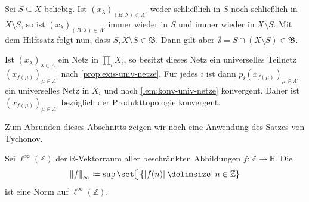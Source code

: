 \begin{beweis}
	Sei $S \subseteq X$ beliebig. 
	Ist $(x_\lambda )_{(B,\lambda)  \in \Lambda'}$ weder schließlich in $S$ noch schließlich in $X \setminus S$, so ist 
	$(x_\lambda )_{(B,\lambda)  \in \Lambda'}$ immer wieder in $S$ und immer wieder in $X \setminus S$.
	Mit dem Hilfssatz folgt nun, dass $S, X \setminus S \in \mathfrak{B}$. Dann gilt aber $\emptyset = S \cap (X \setminus S) \in \mathfrak{B}$. \light
\end{beweis}

\begin{beweis}[{name=[von \cref{satz:tychonov}]}]
	Ist $(x_\lambda )_{\lambda  \in \Lambda}$ ein Netz in $\prod_i X_i$, so besitzt dieses Netz ein universelles Teilnetz $(x_{f(\mu)})_{\mu \in \Lambda'}$ nach \cref{prop:exis-univ-netze}.
	Für jedes $i$ ist dann $p_i(x_{f(\mu)})_{\mu \in \Lambda'}$ ein universelles Netz in $X_i$ und nach \cref{lem:konv-univ-netze} konvergent.
	Daher ist $(x_{f(\mu)})_{\mu \in \Lambda'}$ bezüglich der Produkttopologie konvergent.
\end{beweis}

Zum Abrunden dieses Abschnitts zeigen wir noch eine Anwendung des Satzes von Tychonov.

\begin{definition}[{name=[Vektorraum beschränkter Abbildungen]}]
	Sei $\ell^\infty(\mathbb{Z})$ der $\mathbb{R}$-Vektorraum aller beschränkten Abbildungen $f \colon \mathbb{Z} \to \mathbb{R}$.
	Die 
	\[
		\norm*{f}_\infty \coloneqq \sup \set[\big]{\abs*{f(n)} \given n \in \mathbb{Z}}  
	\]
	ist eine Norm auf $\ell^\infty(\mathbb{Z})$.
\end{definition}

